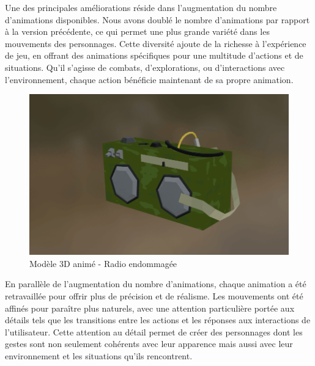 \documentclass[
	article,			%
	11pt,				%
	oneside,			%
	a4paper,			%
	chapter=TITLE,
	french,			%
	sumario=tradicional
	]{base_nt}
\begin{document}
Une des principales améliorations réside dans l'augmentation du nombre d'animations disponibles. Nous avons doublé le nombre d'animations par rapport à la version précédente, ce qui permet une plus grande variété dans les mouvements des personnages. Cette diversité ajoute de la richesse à l'expérience de jeu, en offrant des animations spécifiques pour une multitude d'actions et de situations. Qu'il s'agisse de combats, d'explorations, ou d'interactions avec l'environnement, chaque action bénéficie maintenant de sa propre animation.

\begin{figure}[ht]
	\caption{Modèle 3D animé - Radio endommagée}
	\centering
	\includegraphics[width=1\linewidth]{paper14.png}
	\legend{}
	
\end{figure}

\newpage

En parallèle de l'augmentation du nombre d'animations, chaque animation a été retravaillée pour offrir plus de précision et de réalisme. Les mouvements ont été affinés pour paraître plus naturels, avec une attention particulière portée aux détails tels que les transitions entre les actions et les réponses aux interactions de l'utilisateur. Cette attention au détail permet de créer des personnages dont les gestes sont non seulement cohérents avec leur apparence mais aussi avec leur environnement et les situations qu'ils rencontrent.

\newpage
\end{document}

